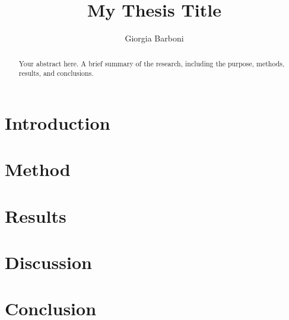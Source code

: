 \documentclass{sapthesis} %
\title{My Thesis Title}
\author{Giorgia Barboni}
\begin{document}
\maketitle


\begin{abstract}
Your abstract here.
A brief summary of the research, including the purpose, methods, results, and conclusions.
\end{abstract}


\tableofcontents




\section{Introduction}




\section{Method}




\section{Results}




\section{Discussion}




\section{Conclusion}






\end{document}
